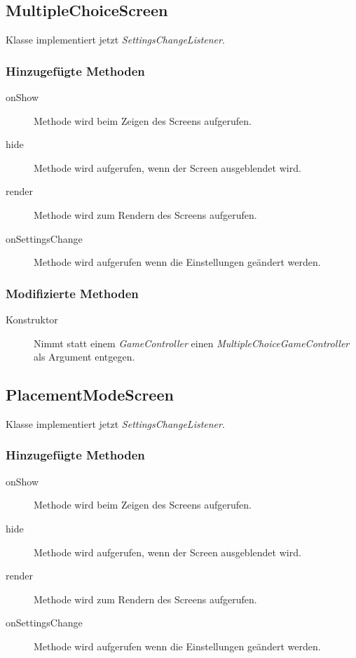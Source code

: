 \subsection{MultipleChoiceScreen}
Klasse implementiert jetzt \emph{SettingsChangeListener}.

\subsubsection{Hinzugefügte Methoden}
\begin{description}

\item[onShow]
Methode wird beim Zeigen des Screens aufgerufen.

\item[hide]
Methode wird aufgerufen, wenn der Screen ausgeblendet wird.

\item[render]
Methode wird zum Rendern des Screens aufgerufen.

\item[onSettingsChange]
Methode wird aufgerufen wenn die Einstellungen geändert werden.

\end{description}

\subsubsection{Modifizierte Methoden}
\begin{description}
\item[Konstruktor]
Nimmt statt einem \emph{GameController} einen \emph{MultipleChoiceGameController} als Argument entgegen.

\end{description}

\subsection{PlacementModeScreen}
Klasse implementiert jetzt \emph{SettingsChangeListener}.

\subsubsection{Hinzugefügte Methoden}
\begin{description}

\item[onShow]
Methode wird beim Zeigen des Screens aufgerufen.

\item[hide]
Methode wird aufgerufen, wenn der Screen ausgeblendet wird.

\item[render]
Methode wird zum Rendern des Screens aufgerufen.

\item[onSettingsChange]
Methode wird aufgerufen wenn die Einstellungen geändert werden.
\end{description}

